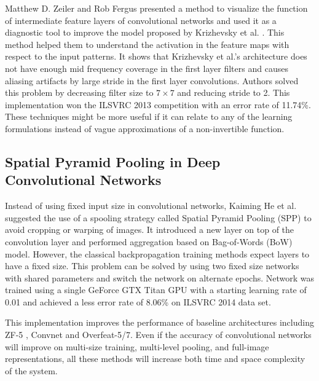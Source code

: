 \documentclass[a4paper]{article}
\begin{document}
Matthew D. Zeiler and Rob Fergus \cite{Zeiler2013} presented a method to visualize the function of intermediate feature layers of convolutional networks and used it as a diagnostic tool to improve  the model proposed by Krizhevsky et al. \cite{Krizhevsky2012a}. This method helped  them  to understand  the activation in the feature maps with respect to the input patterns. It shows that Krizhevsky et al.'s architecture does not have  enough mid frequency coverage in the first layer filters and causes aliasing artifacts by large stride in the first layer convolutions. Authors solved this problem by decreasing filter size to $7\times7$ and reducing stride to 2. This implementation won the  ILSVRC 2013 competition with an error rate of 11.74\%. These  techniques might be more useful if it can relate to any of the learning formulations instead of vague approximations of a non-invertible function.



\subsection{Spatial Pyramid Pooling in Deep Convolutional Networks}
Instead of using fixed input size in convolutional networks, Kaiming He et al. \cite{He2014} suggested  the use of a spooling strategy called  Spatial Pyramid Pooling (SPP) \cite{Grauman2005} \cite{1641019} to avoid cropping or warping of images. It introduced a new layer on top of the convolution layer and performed aggregation  based on Bag-of-Words (BoW) model. However, the classical backpropagation training methods expect layers to have a fixed   size.  This problem can be solved by using two fixed size networks with shared parameters and switch the network on alternate epochs. Network was trained using a single GeForce GTX Titan GPU with a starting  learning rate of 0.01 and achieved  a less  error rate of 8.06\% on  ILSVRC 2014 data set. 
\par 
This implementation improves the performance of baseline architectures including ZF-5 \cite{Zeiler2013}, Convnet \cite{Krizhevsky2012a} and Overfeat-5/7. Even if  the accuracy of convolutional networks will improve on multi-size training, multi-level pooling, and full-image representations, all these methods will increase both time and space complexity of the system.
%
\end{document}

